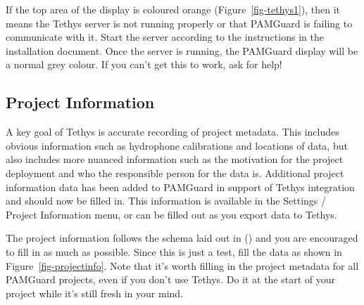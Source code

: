 \documentclass[
]{article}
\begin{document}
If the top area of the display is coloured orange
(Figure~\ref{fig-tethys1}), then it means the Tethys server is not
running properly or that PAMGuard is failing to communicate with it.
Start the server according to the instructions in the installation
document. Once the server is running, the PAMGuard display will be a
normal grey colour. If you can't get this to work, ask for help!

\subsection{Project Information}\label{project-information}

A key goal of Tethys is accurate recording of project metadata. This
includes obvious information such as hydrophone calibrations and
locations of data, but also includes more nuanced information such as
the motivation for the project deployment and who the responsible person
for the data is. Additional project information data has been added to
PAMGuard in support of Tethys integration and should now be filled in.
This information is available in the Settings / Project Information
menu, or can be filled out as you export data to Tethys.

The project information follows the schema laid out in
() and you are encouraged to
fill in as much as possible. Since this is just a test, fill the data as
shown in Figure~\ref{fig-projectinfo}. Note that it's worth filling in
the project metadata for all PAMGuard projects, even if you don't use
Tethys. Do it at the start of your project while it's still fresh in
your mind.
\end{document}
